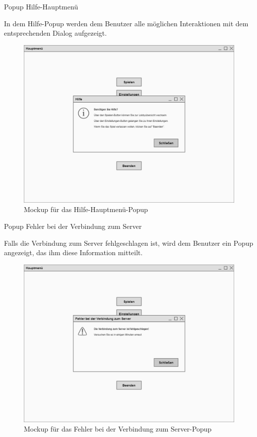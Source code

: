 Popup \glqq{}Hilfe-Hauptmenü\grqq{}

In dem Hilfe-Popup werden dem Benutzer alle möglichen Interaktionen mit dem entsprechenden Dialog aufgezeigt.

\begin{figure}[H]
  \centering
  \includegraphics[width=\textwidth]{Meilenstein03/Hilfe-Hauptmenue_Mockup.png}
  \caption{Mockup für das Hilfe-Hauptmenü-Popup}
\end{figure}

Popup \glqq{}Fehler bei der Verbindung zum Server\grqq{}

Falls die Verbindung zum Server fehlgeschlagen ist, wird dem Benutzer ein Popup angezeigt, das ihm diese Information mitteilt.

\begin{figure}[H]
  \centering
  \includegraphics[width=\textwidth]{Meilenstein03/FehlerBeiDerVerbindungZumServer_Mockup.png}
  \caption{Mockup für das Fehler bei der Verbindung zum Server-Popup}
\end{figure}

